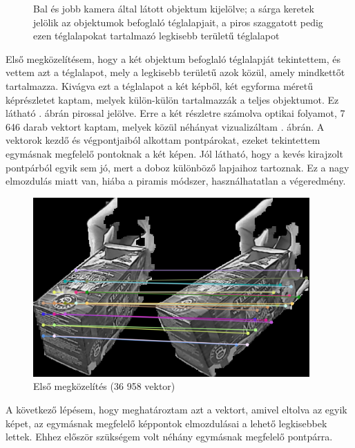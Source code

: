 \begin{figure}[tbh]
\begin{subfigure}[b]{.49\linewidth}
  \end{subfigure}
\caption{Bal és jobb kamera által látott objektum kijelölve; a sárga keretek jelölik az objektumok befoglaló téglalapjait, a piros szaggatott pedig ezen téglalapokat tartalmazó legkisebb területű téglalapot \label{fig:of_original}}
\end{figure}

Első megközelítésem, hogy a két objektum befoglaló téglalapját tekintettem, és vettem azt a téglalapot, mely a legkisebb területű azok közül, amely mindkettőt tartalmazza. Kivágva ezt a téglalapot a két képből, két egyforma méretű képrészletet kaptam, melyek külön-külön tartalmazzák a teljes objektumot. Ez látható . ábrán pirossal jelölve. Erre a két részletre számolva optikai folyamot, 7 646 darab vektort kaptam, melyek közül néhányat vizualizáltam . ábrán. A vektorok kezdő és végpontjaiból alkottam pontpárokat, ezeket tekintettem egymásnak megfelelő pontoknak a két képen. Jól látható, hogy a kevés kirajzolt pontpárból egyik sem jó, mert a doboz különböző lapjaihoz tartoznak. Ez a nagy elmozdulás miatt van, hiába a piramis módszer, használhatatlan a végeredmény.

\begin{figure}[tbh]
\centering
\includegraphics[width=300pt]{figures/vis_bad_0.png}
\caption{Első megközelítés (36 958 vektor) \label{fig:bad0}}
\end{figure}

A következő lépésem, hogy meghatároztam azt a vektort, amivel eltolva az egyik képet, az egymásnak megfelelő képpontok elmozdulásai a lehető legkisebbek lettek. Ehhez először szükségem volt néhány egymásnak megfelelő pontpárra.

